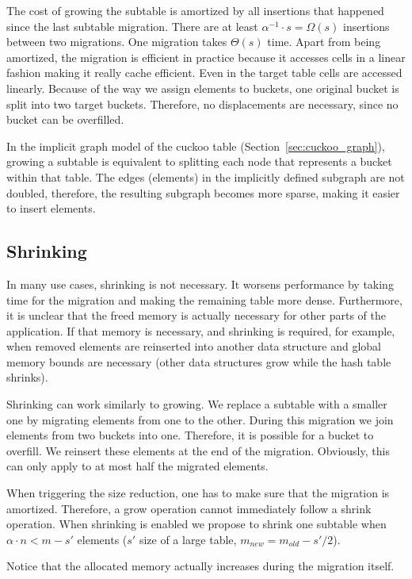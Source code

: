 \documentclass[a4paper,UKenglish]{lipics-v2016}
\begin{document}
The cost of growing the subtable is amortized by all insertions that
happened since the last subtable migration.  There are at least
$\alpha^{-1} \cdot s = \Omega(s)$ insertions between two migrations.
One migration takes $\Theta(s)$ time.  Apart from being amortized,
the migration is efficient in practice because it accesses cells in a
linear fashion making it really cache efficient.  Even in the target
table cells are accessed linearly.  Because of the way we assign
elements to buckets, one original bucket is split into two target
buckets.  Therefore, no displacements are necessary, since no bucket
can be overfilled.

In the implicit graph model of the cuckoo table
(Section~\ref{sec:cuckoo_graph}), growing a subtable is equivalent to
splitting each node that represents a bucket within that table. The
edges (elements) in the implicitly defined subgraph are not doubled,
therefore, the resulting subgraph becomes more sparse, making it
easier to insert elements.

\subsection{Shrinking}
In many use cases, shrinking is not necessary.  It worsens performance
by taking time for the migration and making the remaining table more
dense.  Furthermore, it is unclear that the freed memory is actually
necessary for other parts of the application.  If that memory is
necessary, and shrinking is required, for example, when removed
elements are reinserted into another data structure and global memory
bounds are necessary (other data structures grow while the hash table
shrinks).

Shrinking can work similarly to growing. We replace a subtable with a
smaller one by migrating elements from one to the other.  During this
migration we join elements from two buckets into one. Therefore, it is
possible for a bucket to overfill.  We reinsert these elements at the
end of the migration.  Obviously, this can only apply to at most half
the migrated elements.

When triggering the size reduction, one has to make sure that the
migration is amortized. Therefore, a grow operation cannot immediately
follow a shrink operation.  When shrinking is enabled we propose to
shrink one subtable when $\alpha\cdot n < m-s'$ elements ($s'$ size of a
large table, $m_{new} = m_{old} -s'/2$).

Notice that the allocated memory actually increases during the
migration itself.
\end{document}

